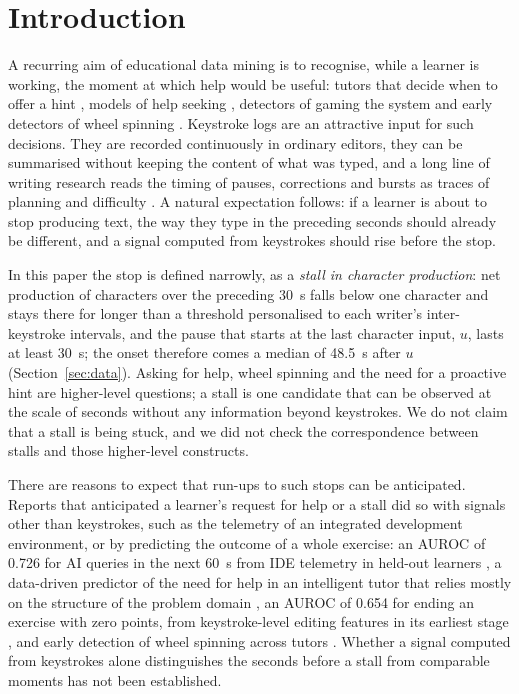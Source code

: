 \section{Introduction}
\label{sec:intro}

A recurring aim of educational data mining is to recognise, while a learner is working, the moment at which help would
be useful: tutors that decide when to offer a hint \cite{maniktala2020helpneed}, models of help seeking
\cite{aleven2006helpseeking}, detectors of gaming the system \cite{baker2005gaming} and early detectors of wheel
spinning \cite{zhang2019wheel}. Keystroke logs are an attractive input for such decisions. They are recorded
continuously in ordinary editors, they can be summarised without keeping the content of what was typed, and a long line
of writing research reads the timing of pauses, corrections and bursts as traces of planning and difficulty
\cite{baaijen2012keystroke,roeser2024disfluencies,conijn2022tagset,conijn2024revision,vasylets2025alignment}. A natural
expectation follows: if a learner is about to stop producing text, the way they type in the preceding seconds should
already be different, and a signal computed from keystrokes should rise before the stop.

In this paper the stop is defined narrowly, as a \emph{stall in character production}: net production of characters
over the preceding 30~s falls below one character and stays there for longer than a threshold personalised to each
writer's inter-keystroke intervals, and the pause that starts at the last character input, $u$, lasts at least 30~s; the
onset therefore comes a median of 48.5~s after $u$ (Section~\ref{sec:data}). Asking for help, wheel spinning and the need for a proactive hint are higher-level questions; a stall is one
candidate that can be observed at the scale of seconds without any information beyond keystrokes. We do not claim that
a stall is being stuck, and we did not check the correspondence between stalls and those higher-level constructs.

There are reasons to expect that run-ups to such stops can be anticipated. Reports that anticipated a learner's request
for help or a stall did so with signals other than keystrokes, such as the telemetry of an integrated development
environment, or by predicting the outcome of a whole exercise: an AUROC of 0.726 for AI queries in the next 60~s from
IDE telemetry in held-out learners \cite{barron2026tutortrace}, a data-driven predictor of the need for help in an intelligent
tutor that relies mostly on the structure of the problem domain \cite{maniktala2020helpneed}, an AUROC of 0.654 for
ending an exercise with zero points, from keystroke-level editing features in its earliest stage
\cite{kofune2026struggling}, and early detection of wheel spinning across tutors \cite{zhang2019wheel}. Whether a signal
computed from keystrokes alone distinguishes the seconds before a stall from comparable moments has not been
established.

